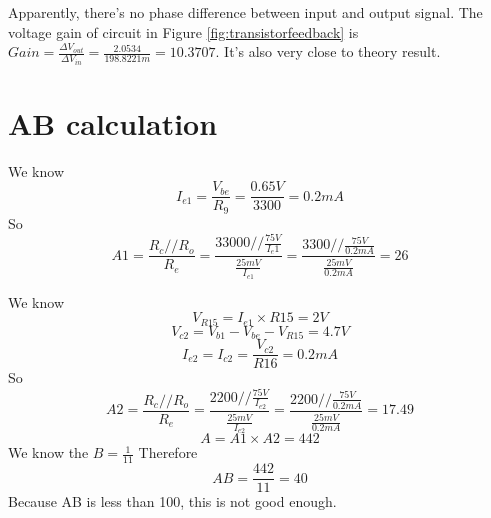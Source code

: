 Apparently, there's no phase difference between input and output signal. 
The voltage gain of circuit in Figure \ref{fig:transistorfeedback} is $ Gain = \frac{\Delta V_{out}}{\Delta V_{in}} = \frac{2.0534}{198.8221m} = 10.3707$. It's also very close to theory result.
 
 
\section{AB calculation}
We know
\[ I_{e1} =\frac{V_{be}}{R_9}=\frac{0.65V}{3300}=0.2mA\]
So
\[ A1=\frac{R_c//R_o}{R_e}=\frac{33000//\frac{75V}{I_e1}}{\frac{25mV}{I_{e1}}}=\frac{3300//\frac{75V}{0.2mA}}{\frac{25mV}{0.2mA}}=26\]

We know
\[ V_{R15}=I_{e1}\times R15=2V\]
\[V_{c2}=V_{b1}-V_{be}-V_{R15}=4.7V\]
\[I_{e2}=I_{c2}=\frac{V_{c2}}{R16}=0.2mA\]
So
\[ A2=\frac{R_c//R_o}{R_e}=\frac{2200//\frac{75V}{I_{e2}}}{\frac{25mV}{I_{e2}}
}=\frac{2200//\frac{75V}{0.2mA}}{\frac{25mV}{0.2mA}}=17.49\]
\[A=A1\times A2=442\]
We know the $B=\frac{1}{11}$
Therefore
\[AB=\frac{442}{11}=40\]
Because AB is less than 100, this is not good enough.